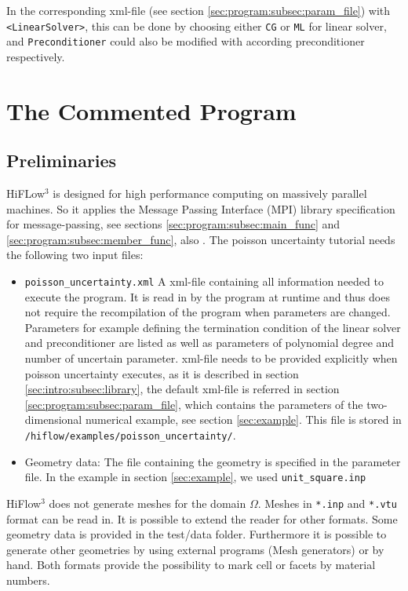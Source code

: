 \documentclass{article}
\begin{document}
In the corresponding xml-file (see section \ref{sec:program:subsec:param_file}) with \texttt{<LinearSolver>}, this can be done by choosing either \texttt{CG} or \texttt{ML} for linear solver, and \texttt{Preconditioner} could also be modified with according preconditioner respectively.


\pagebreak
\section{The Commented Program}
\label{sec:program}


\subsection{Preliminaries}
\label{sec:program:subsec:prelim}

HiFLow$^\text{3}$ is designed for high performance computing on massively parallel machines. So it applies the Message Passing Interface (MPI) library specification for message-passing, see sections \ref{sec:program:subsec:main_func} and \ref{sec:program:subsec:member_func}, also \cite{MPI}. The poisson uncertainty tutorial needs the following two input files:

\begin{itemize}
\item \texttt{poisson\_uncertainty.xml} A xml-file containing all information needed to execute the program. It is read in by the program at runtime and thus does not require the recompilation of the program when parameters are changed. Parameters for example defining the termination condition of the linear solver and preconditioner are listed as well as parameters of polynomial degree and number of uncertain parameter. xml-file needs to be provided explicitly when poisson uncertainty executes, as it is described in section \ref{sec:intro:subsec:library}, the default xml-file is referred in section \ref{sec:program:subsec:param_file}, which contains the parameters of the two-dimensional numerical example, see section \ref{sec:example}. This file is stored in \texttt{/hiflow/examples/poisson\_uncertainty/}.

\item Geometry data: The file containing the geometry is specified in the parameter file. In the example in section \ref{sec:example}, we used   \texttt{unit\_square.inp}
\end{itemize}

HiFlow$^\text{3}$ does not generate meshes for the domain $\Omega$. Meshes in \texttt{*.inp} and \texttt{*.vtu}  format can be read in. It is possible to extend the reader for other formats. Some geometry data is provided in the test/data folder. Furthermore it is possible to generate other geometries by using external programs (Mesh generators) or by hand. Both formats provide the possibility to mark cell or facets by material numbers.
\end{document}
